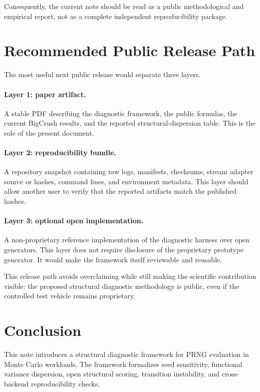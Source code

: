 \documentclass[11pt,a4paper]{article}
\begin{document}
Consequently, the current note should be read as a public methodological and empirical report, not as a complete independent reproducibility package.

\section{Recommended Public Release Path}

The most useful next public release would separate three layers.

\paragraph{Layer 1: paper artifact.} A stable PDF describing the diagnostic framework, the public formulas, the current BigCrush results, and the reported structural-dispersion table. This is the role of the present document.

\paragraph{Layer 2: reproducibility bundle.} A repository snapshot containing raw logs, manifests, checksums, stream adapter source or hashes, command lines, and environment metadata. This layer should allow another user to verify that the reported artifacts match the published hashes.

\paragraph{Layer 3: optional open implementation.} A non-proprietary reference implementation of the diagnostic harness over open generators. This layer does not require disclosure of the proprietary prototype generator. It would make the framework itself reviewable and reusable.

This release path avoids overclaiming while still making the scientific contribution visible: the proposed structural diagnostic methodology is public, even if the controlled test vehicle remains proprietary.

\section{Conclusion}

This note introduces a structural diagnostic framework for PRNG evaluation in Monte Carlo workloads. The framework formalizes seed sensitivity, functional variance dispersion, open structural scoring, transition instability, and cross-backend reproducibility checks.
\end{document}
